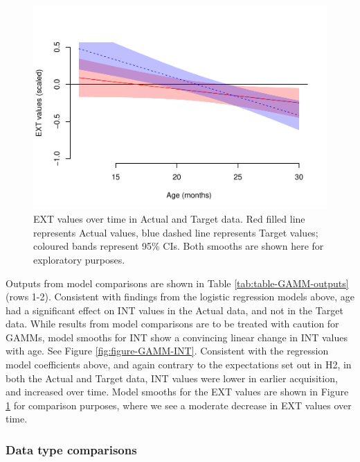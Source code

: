 \documentclass[
  man]{apa6}
\begin{document}
\begin{figure}
\centering
\includegraphics{PhonNetworksProj-accepted_files/figure-latex/figure-GAMM-EXT-1.pdf}
\caption{\label{fig:figure-GAMM-EXT}EXT values over time in Actual and Target data. Red filled line represents Actual values, blue dashed line represents Target values; coloured bands represent 95\% CIs. Both smooths are shown here for exploratory purposes.}
\end{figure}

Outputs from model comparisons are shown in Table \ref{tab:table-GAMM-outputs} (rows 1-2). Consistent with findings from the logistic regression models above, age had a significant effect on INT values in the Actual data, and not in the Target data. While results from model comparisons are to be treated with caution for GAMMs, model smooths for INT show a convincing linear change in INT values with age. See Figure \ref{fig:figure-GAMM-INT}. Consistent with the regression model coefficients above, and again contrary to the expectations set out in H2, in both the Actual and Target data, INT values were lower in earlier acquisition, and increased over time. Model smooths for the EXT values are shown in Figure \ref{fig:figure-GAMM-EXT} for comparison purposes, where we see a moderate decrease in EXT values over time.

\hypertarget{data-type-comparisons}{%
\subsubsection{Data type comparisons}\label{data-type-comparisons}}
\end{document}
